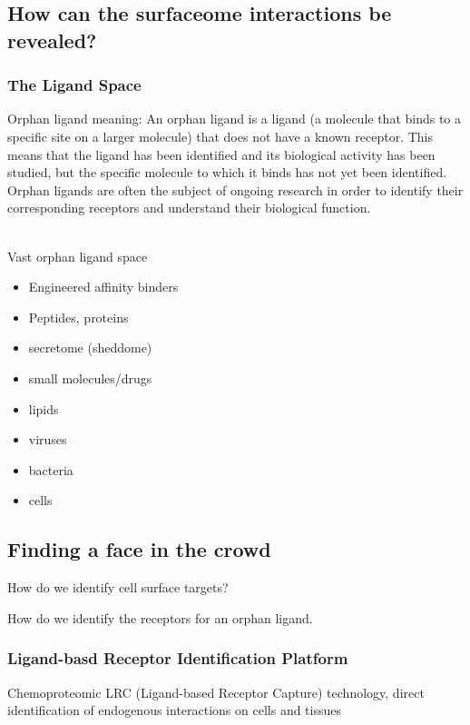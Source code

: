 \begin{itemize}
\begin{itemize}
\begin{itemize}
\end{itemize}

\subsection{How can the surfaceome interactions be revealed?}
\subsubsection{The Ligand Space}
Orphan ligand meaning: An orphan ligand is a ligand (a molecule that binds to a specific site on a larger molecule) that does not have a known receptor. This means that the ligand has been identified and its biological activity has been studied, but the specific molecule to which it binds has not yet been identified. Orphan ligands are often the subject of ongoing research in order to identify their corresponding receptors and understand their biological function.

\\Vast orphan ligand space
\begin{itemize}
    \item Engineered affinity binders
    \item Peptides, proteins
    \item secretome (sheddome)
    \item small molecules/drugs
    \item lipids
    \item viruses
    \item bacteria
    \item cells
\end{itemize}

\subsection{Finding a face in the crowd}
How do we identify cell surface targets?

How do we identify the receptors for an orphan ligand.

\subsubsection{Ligand-basd Receptor Identification Platform}
Chemoproteomic LRC (Ligand-based Receptor Capture) technology, direct identification of endogenous interactions on cells and tissues


\end{itemize}
\end{itemize}
